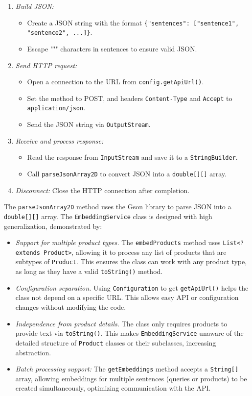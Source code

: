 \documentclass{article}
\begin{document}
\begin{enumerate}
    \item \textit{Build JSON:}
    \begin{itemize}
        \item Create a JSON string with the format \texttt{\{"sentences": ["sentence1", "sentence2", ...]\}}.
        \item Escape """ characters in sentences to ensure valid JSON.
    \end{itemize}
    \item \textit{Send HTTP request:}
    \begin{itemize}
        \item Open a connection to the URL from \texttt{config.getApiUrl()}.
        \item Set the method to POST, and headers \texttt{Content-Type} and \texttt{Accept} to \texttt{application/json}.
        \item Send the JSON string via \texttt{OutputStream}.
    \end{itemize}
    \item \textit{Receive and process response:}
    \begin{itemize}
        \item Read the response from \texttt{InputStream} and save it to a \texttt{StringBuilder}.
        \item Call \texttt{parseJsonArray2D} to convert JSON into a \texttt{double[][]} array.
    \end{itemize}
    \item \textit{Disconnect:} Close the HTTP connection after completion.
\end{enumerate}
The \texttt{parseJsonArray2D} method uses the Gson library to parse JSON into a \texttt{double[][]} array.
The \texttt{EmbeddingService} class is designed with high generalization, demonstrated by:
\begin{itemize}
    \item \textit{Support for multiple product types.} The \texttt{embedProducts} method uses \texttt{List<? extends Product>}, allowing it to process any list of products that are subtypes of \texttt{Product}. This ensures the class can work with any product type, as long as they have a valid \texttt{toString()} method.
    \item \textit{Configuration separation.} Using \texttt{Configuration} to get \texttt{getApiUrl()} helps the class not depend on a specific URL. This allows easy API or configuration changes without modifying the code.
    \item \textit{Independence from product details.} The class only requires products to provide text via \texttt{toString()}. This makes \texttt{EmbeddingService} unaware of the detailed structure of \texttt{Product} classes or their subclasses, increasing abstraction.
    \item \textit{Batch processing support:} The \texttt{getEmbeddings} method accepts a \texttt{String[]} array, allowing embeddings for multiple sentences (queries or products) to be created simultaneously, optimizing communication with the API.
\end{itemize}
\end{document}
